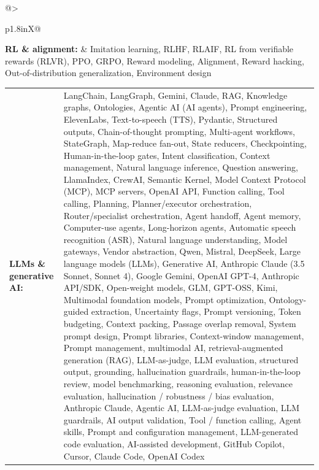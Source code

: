 \documentclass[letterpaper,11pt]{article}
\begin{document}
\par\vspace{2pt}
\begin{tabularx}{\linewidth}{@{}>{\raggedright\arraybackslash}p{1.8in}X@{}}
\textbf{RL \& alignment:} & \footnotesize{Imitation learning, RLHF, RLAIF, RL from verifiable rewards (RLVR), PPO, GRPO, Reward modeling, Alignment, Reward hacking, Out-of-distribution generalization, Environment design}\\
\end{tabularx}
\par\vspace{2pt}
\begin{tabularx}{\linewidth}{@{}>{\raggedright\arraybackslash}p{1.8in}X@{}}
\textbf{LLMs \& generative AI:} & \footnotesize{LangChain, LangGraph, Gemini, Claude, RAG, Knowledge graphs, Ontologies, Agentic AI (AI agents), Prompt engineering, ElevenLabs, Text-to-speech (TTS), Pydantic, Structured outputs, Chain-of-thought prompting, Multi-agent workflows, StateGraph, Map-reduce fan-out, State reducers, Checkpointing, Human-in-the-loop gates, Intent classification, Context management, Natural language inference, Question answering, LlamaIndex, CrewAI, Semantic Kernel, Model Context Protocol (MCP), MCP servers, OpenAI API, Function calling, Tool calling, Planning, Planner/executor orchestration, Router/specialist orchestration, Agent handoff, Agent memory, Computer-use agents, Long-horizon agents, Automatic speech recognition (ASR), Natural language understanding, Model gateways, Vendor abstraction, Qwen, Mistral, DeepSeek, Large language models (LLMs), Generative AI, Anthropic Claude (3.5 Sonnet, Sonnet 4), Google Gemini, OpenAI GPT-4, Anthropic API/SDK, Open-weight models, GLM, GPT-OSS, Kimi, Multimodal foundation models, Prompt optimization, Ontology-guided extraction, Uncertainty flags, Prompt versioning, Token budgeting, Context packing, Passage overlap removal, System prompt design, Prompt libraries, Context-window management, Prompt management, multimodal AI, retrieval-augmented generation (RAG), LLM-as-judge, LLM evaluation, structured output, grounding, hallucination guardrails, human-in-the-loop review, model benchmarking, reasoning evaluation, relevance evaluation, hallucination / robustness / bias evaluation, Anthropic Claude, Agentic AI, LLM-as-judge evaluation, LLM guardrails, AI output validation, Tool / function calling, Agent skills, Prompt and configuration management, LLM-generated code evaluation, AI-assisted development, GitHub Copilot, Cursor, Claude Code, OpenAI Codex}\\
\end{tabularx}
\end{document}
